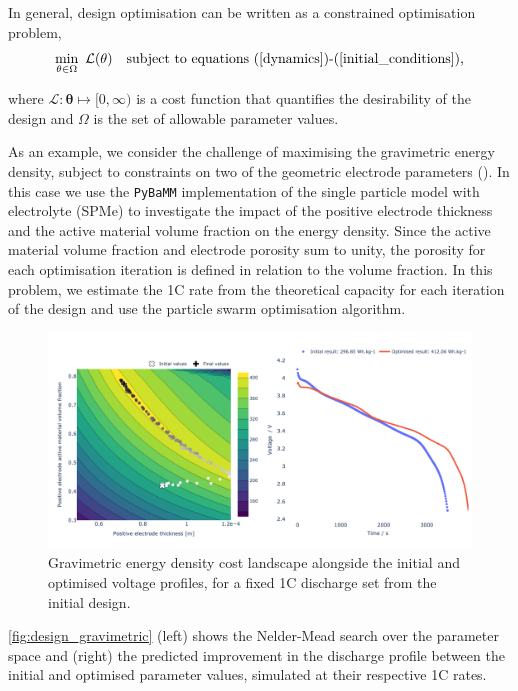 \documentclass[
]{article}
\begin{document}
In general, design optimisation can be written as a constrained
optimisation problem, \begin{equation}
\min_{\mathbf{\theta} \in \Omega} ~ \mathcal{L}(\mathbf{\theta}) ~~~
\textrm{subject to equations (\ref{dynamics})\textrm{-}(\ref{initial_conditions}),}
\label{eqn:design}
\end{equation}

where \(\mathcal{L} : \mathbf{\theta} \mapsto [0,\infty)\) is a cost
function that quantifies the desirability of the design and \(\Omega\)
is the set of allowable parameter values.

As an example, we consider the challenge of maximising the gravimetric
energy density, subject to constraints on two of the geometric electrode
parameters (). In this case
we use the \texttt{PyBaMM} implementation of the single particle model
with electrolyte (SPMe) to investigate the impact of the positive
electrode thickness and the active material volume fraction on the
energy density. Since the active material volume fraction and electrode
porosity sum to unity, the porosity for each optimisation iteration is
defined in relation to the volume fraction. In this problem, we estimate
the 1C rate from the theoretical capacity for each iteration of the
design and use the particle swarm optimisation algorithm.

\begin{figure}
\centering
\includegraphics[width=1\textwidth,height=\textheight]{figures/joss/design.png}
\caption{Gravimetric energy density cost landscape alongside the initial
and optimised voltage profiles, for a fixed 1C discharge set from the
initial design. \label{fig:design_gravimetric}}
\end{figure}

\autoref{fig:design_gravimetric} (left) shows the Nelder-Mead search
over the parameter space and (right) the predicted improvement in the
discharge profile between the initial and optimised parameter values,
simulated at their respective 1C rates.
\end{document}
